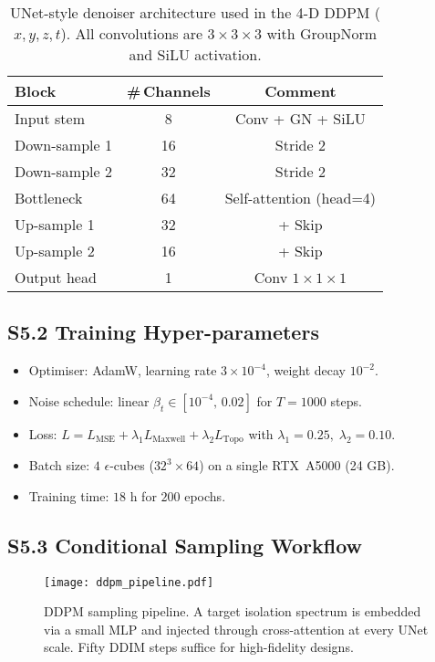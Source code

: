 \documentclass[11pt]{article}
\begin{document}
\begin{table}[h]
  \centering
  \caption{UNet-style denoiser architecture used in the 4-D DDPM
  (\(x,y,z,t\)).  All convolutions are \(3\times3\times3\) with
  GroupNorm and SiLU activation.}
  \label{tab:S5_arch}
  \begin{tabular}{lcc}
    \hline
    Block & \#\,Channels & Comment\\
    \hline
    Input stem & 8 & Conv + GN + SiLU\\
    Down-sample 1 & 16 & Stride 2\\
    Down-sample 2 & 32 & Stride 2\\
    Bottleneck & 64 & Self-attention (head=4)\\
    Up-sample 1 & 32 & + Skip\\
    Up-sample 2 & 16 & + Skip\\
    Output head & 1 & Conv \(1\times1\times1\)\\
    \hline
  \end{tabular}
\end{table}

\subsection*{S5.2  Training Hyper-parameters}

\begin{itemize}
  \item Optimiser: AdamW, learning rate \(3\times10^{-4}\), weight
        decay \(10^{-2}\).
  \item Noise schedule: linear \(\beta_t\in[10^{-4},\,0.02]\) for
        \(T=1000\) steps.
  \item Loss: \(L=L_{\mathrm{MSE}}+\lambda_1L_{\mathrm{Maxwell}}
               +\lambda_2L_{\mathrm{Topo}}\)  
        with \(\lambda_1=0.25,\;\lambda_2=0.10\).
  \item Batch size: \(4\) $\epsilon$-cubes (\(32^3\times64\)) on a single
        RTX~A5000 (24 GB).
  \item Training time: \(18\) h for \(200\) epochs.
\end{itemize}

\subsection*{S5.3  Conditional Sampling Workflow}

\begin{figure}[h]
  \centering
  \texttt{[image: ddpm\_pipeline.pdf]}
  \caption{DDPM sampling pipeline.  A target isolation spectrum is
  embedded via a small MLP and injected through cross-attention at
  every UNet scale.  Fifty DDIM steps suffice for high-fidelity
  designs.}
  \label{fig:S5_pipeline}
\end{figure}
\end{document}
